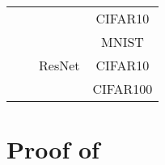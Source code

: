 \begin{center}
\begin{table}[H]
\begin{tabular}{|c|c|c|c|}
                        \cline{4-4} 
                        & & & CIFAR10 \\                   
                        \cline{3-4}
                         &   & \multirow{3}{*}{ResNet} & MNIST \\
                         \cline{4-4}
                         &   & & CIFAR10 \\
                         \cline{4-4}
                         &   & & CIFAR100 \\
        \hline
        \end{tabular}
    \end{table}    
\end{center}

\newpage
\section{Proof of } \label{app:proof_lem_error}

